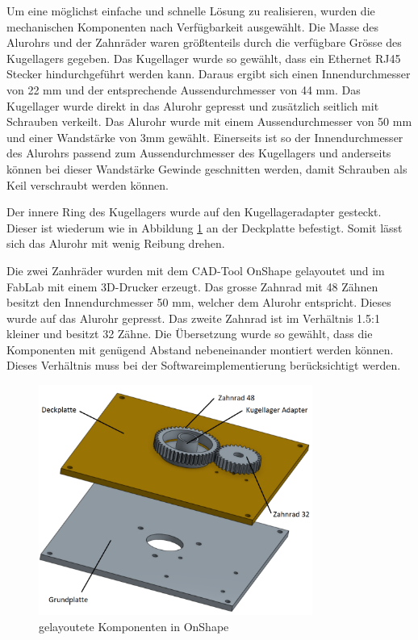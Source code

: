 Um eine möglichst einfache und schnelle Lösung zu realisieren, wurden die mechanischen Komponenten nach Verfügbarkeit ausgewählt. Die Masse des Alurohrs und der Zahnräder waren größtenteils durch die verfügbare Grösse des Kugellagers gegeben. Das Kugellager wurde so gewählt, dass ein Ethernet RJ45 Stecker hindurchgeführt werden kann. Daraus ergibt sich einen Innendurchmesser von 22 mm und der entsprechende Aussendurchmesser von 44 mm.
Das Kugellager wurde direkt in das Alurohr gepresst und zusätzlich seitlich mit Schrauben verkeilt. Das Alurohr wurde mit einem Aussendurchmesser von 50 mm und einer Wandstärke von 3mm gewählt. Einerseits ist so der Innendurchmesser des Alurohrs passend zum Aussendurchmesser des Kugellagers und anderseits können bei dieser Wandstärke Gewinde geschnitten werden, damit Schrauben als Keil verschraubt werden können.

Der innere Ring des Kugellagers wurde auf den Kugellageradapter gesteckt. Dieser ist wiederum wie in Abbildung \ref{fig:mechKomp} an der Deckplatte befestigt. Somit lässt sich das Alurohr mit wenig Reibung drehen.

Die zwei Zanhräder wurden mit dem CAD-Tool OnShape gelayoutet und im FabLab mit einem 3D-Drucker erzeugt. Das grosse Zahnrad mit 48 Zähnen besitzt den Innendurchmesser 50 mm, welcher dem Alurohr entspricht. Dieses wurde auf das Alurohr gepresst. Das zweite Zahnrad ist im Verhältnis 1.5:1 kleiner und besitzt 32 Zähne. Die Übersetzung wurde so gewählt, dass die Komponenten mit genügend Abstand nebeneinander montiert werden können. Dieses Verhältnis muss bei der Softwareimplementierung berücksichtigt werden.

\begin{figure}[H]
	\centering
	\includegraphics[width=0.8\textwidth]{resources/mechKomp2.PNG}
	\caption{gelayoutete Komponenten in OnShape}
	\label{fig:mechKomp}
\end{figure} 

